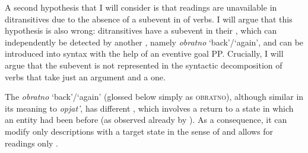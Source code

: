 \documentclass[output=paper]{langscibook}
\begin{document}
A second hypothesis that I will consider is that  readings are unavailable in  ditransitives due to the absence of a  subevent in  of  verbs. I will argue that this hypothesis is also wrong: ditransitives have a  subevent in their , which can independently be detected by another  , namely \textit{obratno} ‘back’/‘again’, and can be introduced into syntax with the help of an eventive goal PP. Crucially, I will argue that the  subevent is not represented in the syntactic decomposition of  verbs that take just an  argument and a  one.\largerpage[-4]



The   \textit{obratno} ‘back’/‘again’ (glossed below simply as \textsc{obratno}), although similar in its meaning to \textit{opjat’}, has different , which involves a return to a state in which an entity had been before (as observed already by \citealt{Tatevosov2016}). As a consequence, it can modify only descriptions with a target state in the sense of \citep{Kratzer2000} and allows for  readings only .
\end{document}
